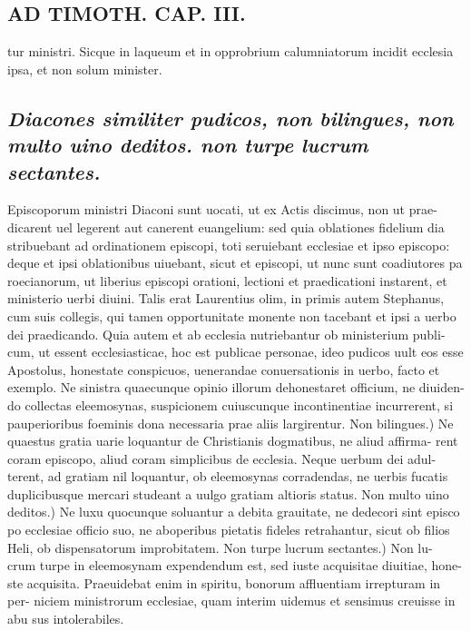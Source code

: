 \documentclass{article}
\begin{document}
\begin{pages}
\section*{AD TIMOTH. CAP. III. }
\marginpar{[ p.499 ]}\pstart tur ministri. Sicque in laqueum et in opprobrium calumniatorum incidit ecclesia ipsa, et non solum minister.  \pend
{}
{}
\subsection*{\textit{Diacones similiter pudicos, non bilingues, non multo uino deditos. non turpe lucrum sectantes. }}\pstart Episcoporum ministri Diaconi sunt uocati, ut ex Actis discimus, non ut prae- dicarent uel legerent aut canerent euangelium: sed quia oblationes fidelium dia stribuebant ad ordinationem episcopi, toti seruiebant ecclesiae et ipso episcopo: deque et ipsi oblationibus uiuebant, sicut et episcopi, ut nunc sunt coadiutores pa roecianorum, ut liberius episcopi orationi, lectioni et praedicationi instarent, et ministerio uerbi diuini. Talis erat Laurentius olim, in primis autem Stephanus, cum suis collegis, qui tamen opportunitate monente non tacebant et ipsi a uerbo dei praedicando. Quia autem et ab ecclesia nutriebantur ob ministerium publi- cum, ut essent ecclesiasticae, hoc est publicae personae, ideo pudicos uult eos esse Apostolus, honestate conspicuos, uenerandae conuersationis in uerbo, facto et exemplo. Ne sinistra quaecunque opinio illorum dehonestaret officium, ne diuiden- do collectas eleemosynas, suspicionem cuiuscunque incontinentiae incurrerent, si pauperioribus foeminis dona necessaria prae aliis largirentur. Non bilingues.) Ne quaestus gratia uarie loquantur de Christianis dogmatibus, ne aliud affirma- rent coram episcopo, aliud coram simplicibus de ecclesia. Neque uerbum dei adul- terent, ad gratiam nil loquantur, ob eleemosynas corradendas, ne uerbis fucatis duplicibusque mercari studeant a uulgo gratiam altioris status. Non multo uino deditos.) Ne luxu quocunque soluantur a debita grauitate, ne dedecori sint episco po ecclesiae officio suo, ne aboperibus pietatis fideles retrahantur, sicut ob filios Heli, ob dispensatorum improbitatem. Non turpe lucrum sectantes.) Non lu- crum turpe in eleemosynam expendendum est, sed iuste acquisitae diuitiae, hone- ste acquisita. Praeuidebat enim in spiritu, bonorum affluentiam irrepturam in per- niciem ministrorum ecclesiae, quam interim uidemus et sensimus creuisse in abu sus intolerabiles.  \pend
{}
{}

\end{pages}
\end{document}

